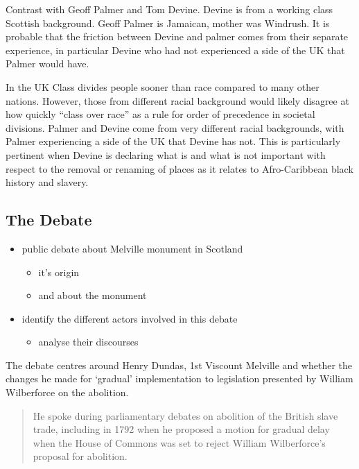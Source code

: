 \documentclass{scrartcl}
\begin{document}
Contrast with Geoff Palmer and Tom Devine. Devine is from a working class Scottish background. Geoff Palmer is Jamaican, mother was Windrush. It  is probable that the friction between Devine and palmer comes from their separate experience, in particular Devine who had not experienced a side of the UK that Palmer would have.

In the UK Class divides people sooner than race compared to many other nations. However, those from different racial background would likely disagree at how quickly ``class over race'' as a rule for order of precedence in societal divisions.  Palmer and Devine come from very different racial backgrounds, with Palmer experiencing a side of the UK that Devine has not. This  is particularly pertinent when Devine is declaring what is and what is not important with respect to the removal or renaming of places as it relates to Afro-Caribbean black history and slavery.

\subsection{The Debate}

\begin{itemize}
    \item public debate about Melville monument in Scotland
    \begin{itemize}
        \item it's origin
    \end{itemize}
    \begin{itemize}
        \item and about the monument
    \end{itemize}
    \item identify the different actors involved in this debate
    \begin{itemize}
        \item analyse their discourses
    \end{itemize}
\end{itemize}

The debate centres around Henry Dundas, 1st Viscount Melville and whether the changes he made for `gradual' implementation to legislation presented by William Wilberforce on the abolition.

\begin{quotation}
    He spoke during parliamentary debates on abolition of the British slave trade, including in 1792 when he proposed a motion for gradual delay when the House of Commons was set to reject William Wilberforce’s proposal for abolition. 
\end{quotation}
\cite{mullen_2021}
\end{document}
